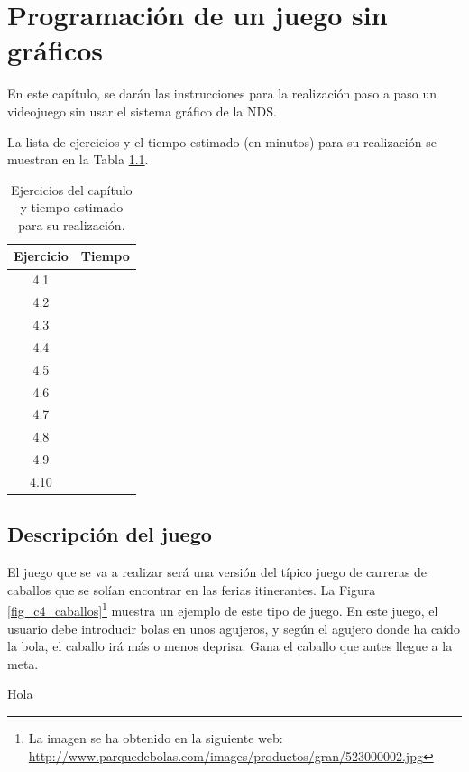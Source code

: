 \chapter{Programación de un juego sin gráficos}

En este capítulo, se darán las instrucciones para la realización paso a paso un videojuego sin usar el sistema gráfico de la NDS.

La lista de ejercicios y el tiempo estimado (en minutos) para su realización se muestran en la Tabla \ref{c4_tab:ejercios}.

\begin{table}[t]
\centering
\caption{Ejercicios del capítulo y tiempo estimado para su realización.}
\begin{tabular}{|c|c|}
\hline 
Ejercicio & Tiempo  \\ 
\hline 
 4.1 &   \\ 
 4.2 &   \\ 
 4.3 &    \\ 
 4.4 & \\ 
 4.5 & \\ 
 4.6 & \\ 
 4.7 & \\ 
 4.8 & \\ 
 4.9 & \\ 
 4.10 & \\
\hline 
\end{tabular} 
\label{c4_tab:ejercios}
\end{table}
\section{Descripción del juego}
El juego que se va a realizar será una versión del típico juego de carreras de caballos que se solían encontrar en las ferias itinerantes. La Figura \ref{fig_c4_caballos}\footnote{La imagen se ha obtenido en la siguiente web: \url{http://www.parquedebolas.com/images/productos/gran/523000002.jpg}} muestra un ejemplo de este tipo de juego. En este juego, el usuario debe introducir bolas en unos agujeros, y según el agujero donde ha caído la bola, el caballo irá más o menos deprisa. Gana el caballo que antes llegue a la meta.

Hola

